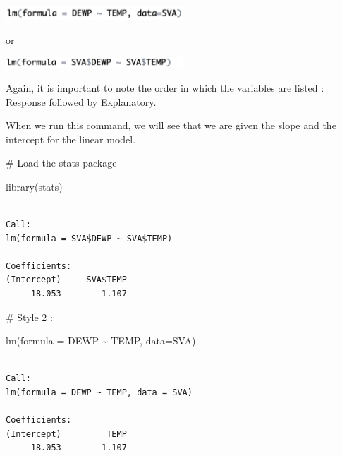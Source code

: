 \documentclass[
  letterpaper,
  DIV=11,
  numbers=noendperiod]{scrreprt}
\newenvironment{Shaded}{\begin{snugshade}}{\end{snugshade}}
\newcommand{\AttributeTok}[1]{\textcolor[rgb]{0.40,0.45,0.13}{#1}}
\newcommand{\CommentTok}[1]{\textcolor[rgb]{0.37,0.37,0.37}{#1}}
\newcommand{\FunctionTok}[1]{\textcolor[rgb]{0.28,0.35,0.67}{#1}}
\newcommand{\NormalTok}[1]{\textcolor[rgb]{0.00,0.23,0.31}{#1}}
\newcommand{\SpecialCharTok}[1]{\textcolor[rgb]{0.37,0.37,0.37}{#1}}
\begin{document}
\includegraphics[width=0.5\textwidth,height=\textheight]{./images/LMR_9.jpg}

or

\includegraphics[width=0.5\textwidth,height=\textheight]{./images/LMR_10.jpg}

Again, it is important to note the order in which the variables are
listed : Response followed by Explanatory.

When we run this command, we will see that we are given the slope and
the intercept for the linear model.

\begin{Shaded}
\begin{Highlighting}[]
\CommentTok{\# Load the stats package}

\FunctionTok{library}\NormalTok{(stats)}
\end{Highlighting}
\end{Shaded}

\begin{Shaded}
\end{Shaded}

\begin{verbatim}

Call:
lm(formula = SVA$DEWP ~ SVA$TEMP)

Coefficients:
(Intercept)     SVA$TEMP  
    -18.053        1.107  
\end{verbatim}

\begin{Shaded}
\begin{Highlighting}[]
\CommentTok{\# Style 2 : }

\FunctionTok{lm}\NormalTok{(}\AttributeTok{formula =}\NormalTok{ DEWP }\SpecialCharTok{\textasciitilde{}}\NormalTok{ TEMP, }\AttributeTok{data=}\NormalTok{SVA)}
\end{Highlighting}
\end{Shaded}

\begin{verbatim}

Call:
lm(formula = DEWP ~ TEMP, data = SVA)

Coefficients:
(Intercept)         TEMP  
    -18.053        1.107  
\end{verbatim}
\end{document}
